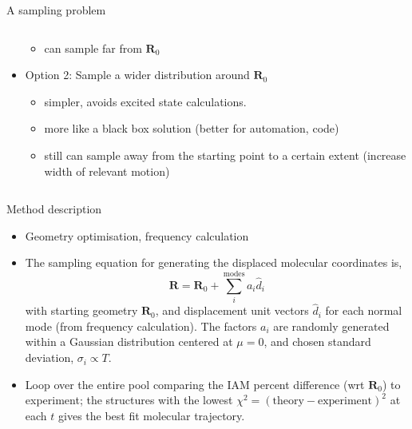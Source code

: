 \documentclass{beamer}
\begin{document}
\begin{frame}{A sampling problem}
\begin{columns}
\begin{column}{0.5\textwidth}
\begin{itemize}
				\begin{itemize}
					\item can sample far from $\textbf{R}_0$
				\end{itemize}
				\item Option 2: Sample a wider distribution around $\textbf{R}_0$
				\begin{itemize}
					\item simpler, avoids excited state calculations. 
					\item more like a black box solution (better for automation, code)
					\item still can sample away from the starting point to a certain extent (increase width of relevant motion)
				\end{itemize}
			\end{itemize}
		\end{column}	
	\end{columns}
\end{frame}

\begin{frame}{Method description}
	\begin{itemize}
	\item Geometry optimisation, frequency calculation
	\item	The sampling equation for generating the displaced molecular coordinates is,
	\[
	\textbf{R} = \textbf{R}_0 + \sum_i^{\textrm{modes}} a_i\hat{d}_i
	\]
	with starting geometry $\textbf{R}_0$, and displacement unit vectors $\hat{d}_i$ for each normal mode (from frequency calculation).  The factors $a_i$ are randomly generated within a Gaussian distribution centered at $\mu=0$, and chosen standard deviation, $\sigma_i \propto T$.

	\item Loop over the entire pool comparing the IAM percent difference (wrt $\textbf{R}_0$) to experiment; the structures with the lowest $\chi^2=(\textrm{theory}-\textrm{experiment})^2$ at each $t$ gives the best fit molecular trajectory.	
	\end{itemize}
\end{frame}
\end{document}
